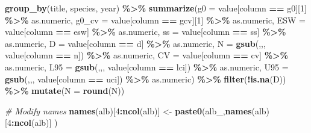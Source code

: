 \documentclass[
]{book}
\newenvironment{Shaded}{\begin{snugshade}}{\end{snugshade}}
\newcommand{\AttributeTok}[1]{\textcolor[rgb]{0.13,0.29,0.53}{#1}}
\newcommand{\CommentTok}[1]{\textcolor[rgb]{0.56,0.35,0.01}{\textit{#1}}}
\newcommand{\DecValTok}[1]{\textcolor[rgb]{0.00,0.00,0.81}{#1}}
\newcommand{\FunctionTok}[1]{\textcolor[rgb]{0.13,0.29,0.53}{\textbf{#1}}}
\newcommand{\NormalTok}[1]{#1}
\newcommand{\OtherTok}[1]{\textcolor[rgb]{0.56,0.35,0.01}{#1}}
\newcommand{\SpecialCharTok}[1]{\textcolor[rgb]{0.81,0.36,0.00}{\textbf{#1}}}
\newcommand{\StringTok}[1]{\textcolor[rgb]{0.31,0.60,0.02}{#1}}
\begin{document}
\begin{Shaded}
\begin{Highlighting}[]
    \FunctionTok{group\_by}\NormalTok{(title, species, year) }\SpecialCharTok{\%\textgreater{}\%}
    \FunctionTok{summarize}\NormalTok{(}\AttributeTok{g0 =}\NormalTok{ value[column }\SpecialCharTok{==} \StringTok{\textquotesingle{}g0\textquotesingle{}}\NormalTok{][}\DecValTok{1}\NormalTok{] }\SpecialCharTok{\%\textgreater{}\%}\NormalTok{ as.numeric,}
              \AttributeTok{g0\_cv =}\NormalTok{ value[column }\SpecialCharTok{==} \StringTok{\textquotesingle{}gcv\textquotesingle{}}\NormalTok{][}\DecValTok{1}\NormalTok{] }\SpecialCharTok{\%\textgreater{}\%}\NormalTok{ as.numeric,}
              \AttributeTok{ESW =}\NormalTok{ value[column }\SpecialCharTok{==} \StringTok{\textquotesingle{}esw\textquotesingle{}}\NormalTok{] }\SpecialCharTok{\%\textgreater{}\%}\NormalTok{ as.numeric,}
              \AttributeTok{ss =}\NormalTok{ value[column }\SpecialCharTok{==} \StringTok{\textquotesingle{}ss\textquotesingle{}}\NormalTok{] }\SpecialCharTok{\%\textgreater{}\%}\NormalTok{ as.numeric,}
              \AttributeTok{D =}\NormalTok{ value[column }\SpecialCharTok{==} \StringTok{\textquotesingle{}d\textquotesingle{}}\NormalTok{] }\SpecialCharTok{\%\textgreater{}\%}\NormalTok{ as.numeric,}
              \AttributeTok{N =} \FunctionTok{gsub}\NormalTok{(}\StringTok{\textquotesingle{},\textquotesingle{}}\NormalTok{,}\StringTok{\textquotesingle{}\textquotesingle{}}\NormalTok{, value[column }\SpecialCharTok{==} \StringTok{\textquotesingle{}n\textquotesingle{}}\NormalTok{]) }\SpecialCharTok{\%\textgreater{}\%}\NormalTok{ as.numeric,}
              \AttributeTok{CV =}\NormalTok{ value[column }\SpecialCharTok{==} \StringTok{\textquotesingle{}cv\textquotesingle{}}\NormalTok{] }\SpecialCharTok{\%\textgreater{}\%}\NormalTok{ as.numeric,}
              \AttributeTok{L95 =} \FunctionTok{gsub}\NormalTok{(}\StringTok{\textquotesingle{},\textquotesingle{}}\NormalTok{,}\StringTok{\textquotesingle{}\textquotesingle{}}\NormalTok{, value[column }\SpecialCharTok{==} \StringTok{\textquotesingle{}lci\textquotesingle{}}\NormalTok{]) }\SpecialCharTok{\%\textgreater{}\%}\NormalTok{ as.numeric,}
              \AttributeTok{U95 =} \FunctionTok{gsub}\NormalTok{(}\StringTok{\textquotesingle{},\textquotesingle{}}\NormalTok{,}\StringTok{\textquotesingle{}\textquotesingle{}}\NormalTok{, value[column }\SpecialCharTok{==} \StringTok{\textquotesingle{}uci\textquotesingle{}}\NormalTok{]) }\SpecialCharTok{\%\textgreater{}\%}\NormalTok{ as.numeric) }\SpecialCharTok{\%\textgreater{}\%}
    \FunctionTok{filter}\NormalTok{(}\SpecialCharTok{!}\FunctionTok{is.na}\NormalTok{(D)) }\SpecialCharTok{\%\textgreater{}\%}
    \FunctionTok{mutate}\NormalTok{(}\AttributeTok{N =} \FunctionTok{round}\NormalTok{(N))}

\CommentTok{\# Modify names}
\FunctionTok{names}\NormalTok{(alb)[}\DecValTok{4}\SpecialCharTok{:}\FunctionTok{ncol}\NormalTok{(alb)] }\OtherTok{\textless{}{-}} \FunctionTok{paste0}\NormalTok{(}\StringTok{\textquotesingle{}alb\_\textquotesingle{}}\NormalTok{,}\FunctionTok{names}\NormalTok{(alb)[}\DecValTok{4}\SpecialCharTok{:}\FunctionTok{ncol}\NormalTok{(alb)] )}
\end{Highlighting}
\end{Shaded}
\end{document}
